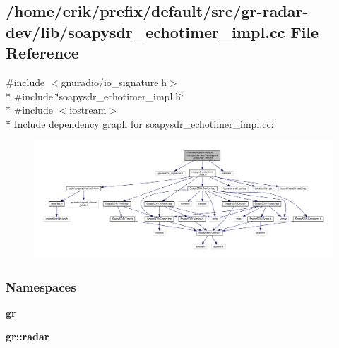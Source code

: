 \subsection{/home/erik/prefix/default/src/gr-\/radar-\/dev/lib/soapysdr\+\_\+echotimer\+\_\+impl.cc File Reference}
\label{soapysdr__echotimer__impl_8cc}
{\ttfamily \#include $<$gnuradio/io\+\_\+signature.\+h$>$}\\*
{\ttfamily \#include \char`\"{}soapysdr\+\_\+echotimer\+\_\+impl.\+h\char`\"{}}\\*
{\ttfamily \#include $<$iostream$>$}\\*
Include dependency graph for soapysdr\+\_\+echotimer\+\_\+impl.\+cc\+:
\nopagebreak
\begin{figure}[H]
\begin{center}
\leavevmode
\includegraphics[width=350pt]{d5/d37/soapysdr__echotimer__impl_8cc__incl}
\end{center}
\end{figure}
\subsubsection*{Namespaces}
\begin{DoxyCompactItemize}
\item 
 {\bf gr}
\item 
 {\bf gr\+::radar}
\end{DoxyCompactItemize}
